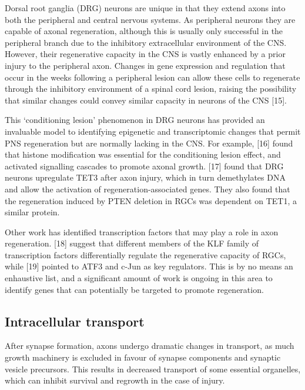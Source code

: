 \documentclass[
  12pt,
  a4paper,
]{book}
\begin{document}
Dorsal root ganglia (DRG) neurons are unique in that they extend axons into both the peripheral and central nervous systems. As peripheral neurons they are capable of axonal regeneration, although this is usually only successful in the peripheral branch due to the inhibitory extracellular environment of the CNS. However, their regenerative capacity in the CNS is vastly enhanced by a prior injury to the peripheral axon. Changes in gene expression and regulation that occur in the weeks following a peripheral lesion can allow these cells to regenerate through the inhibitory environment of a spinal cord lesion, raising the possibility that similar changes could convey similar capacity in neurons of the CNS {[}15{]}.

This `conditioning lesion' phenomenon in DRG neurons has provided an invaluable model to identifying epigenetic and transcriptomic changes that permit PNS regeneration but are normally lacking in the CNS. For example, {[}16{]} found that histone modification was essential for the conditioning lesion effect, and activated signalling cascades to promote axonal growth. {[}17{]} found that DRG neurons upregulate TET3 after axon injury, which in turn demethylates DNA and allow the activation of regeneration-associated genes. They also found that the regeneration induced by PTEN deletion in RGCs was dependent on TET1, a similar protein.

Other work has identified transcription factors that may play a role in axon regeneration. {[}18{]} suggest that different members of the KLF family of transcription factors differentially regulate the regenerative capacity of RGCs, while {[}19{]} pointed to ATF3 and c-Jun as key regulators. This is by no means an enhaustive list, and a significant amount of work is ongoing in this area to identify genes that can potentially be targeted to promote regeneration.

\hypertarget{intracellular-transport}{%
\subsection{Intracellular transport}\label{intracellular-transport}}

After synapse formation, axons undergo dramatic changes in transport, as much growth machinery is excluded in favour of synapse components and synaptic vesicle precursors. This results in decreased transport of some essential organelles, which can inhibit survival and regrowth in the case of injury.
\end{document}

